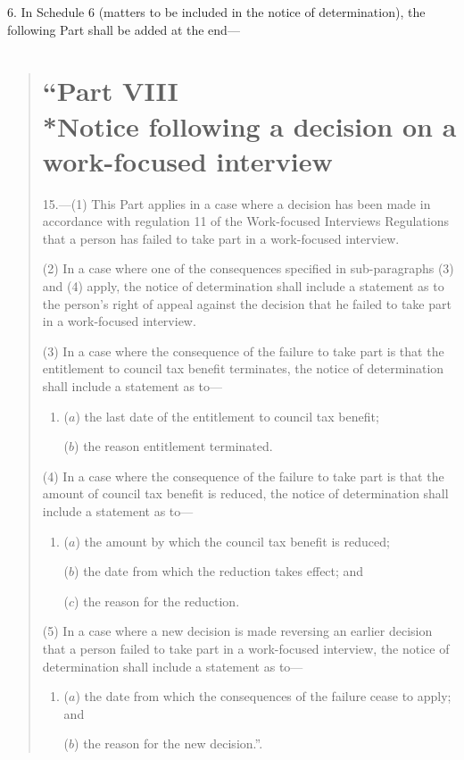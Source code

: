 \documentclass[12pt,a4paper]{article}
\begin{document}
6.  In Schedule 6 (matters to be included in the notice of determination), the following Part shall be added at the end—
\begin{quotation}
\section*{\sloppy “Part VIII\\*Notice following a decision on a work-focused interview}

15.---(1)  This Part applies in a case where a decision has been made in accordance with regulation 11 of the Work-focused Interviews Regulations that a person has failed to take part in a work-focused interview.

(2) In a case where one of the consequences specified in sub-paragraphs (3) and (4) apply, the notice of determination shall include a statement as to the person’s right of appeal against the decision that he failed to take part in a work-focused interview.

(3) In a case where the consequence of the failure to take part is that the entitlement to council tax benefit terminates, the notice of determination shall include a statement as to—
\begin{enumerate}\item[]
($a$) the last date of the entitlement to council tax benefit;

($b$) the reason entitlement terminated.
\end{enumerate}

(4) In a case where the consequence of the failure to take part is that the amount of council tax benefit is reduced, the notice of determination shall include a statement as to—
\begin{enumerate}\item[]
($a$) the amount by which the council tax benefit is reduced;

($b$) the date from which the reduction takes effect; and

($c$) the reason for the reduction.
\end{enumerate}

(5) In a case where a new decision is made reversing an earlier decision that a person failed to take part in a work-focused interview, the notice of determination shall include a statement as to—
\begin{enumerate}\item[]
($a$) the date from which the consequences of the failure cease to apply; and

($b$) the reason for the new decision.”.
\end{enumerate}
\end{quotation}
\end{document}
